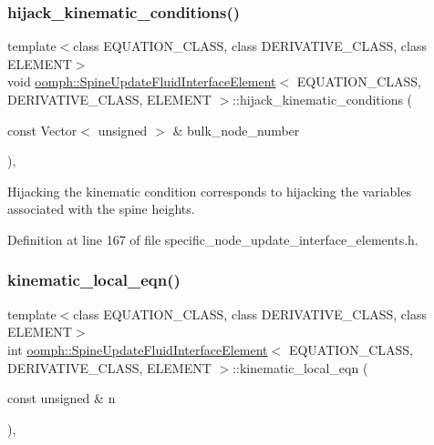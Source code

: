 \subsubsection{\texorpdfstring{hijack\+\_\+kinematic\+\_\+conditions()}{hijack\_kinematic\_conditions()}}
{\footnotesize\ttfamily template$<$class E\+Q\+U\+A\+T\+I\+O\+N\+\_\+\+C\+L\+A\+SS, class D\+E\+R\+I\+V\+A\+T\+I\+V\+E\+\_\+\+C\+L\+A\+SS, class E\+L\+E\+M\+E\+NT$>$ \\
void \hyperlink{classoomph_1_1SpineUpdateFluidInterfaceElement}{oomph\+::\+Spine\+Update\+Fluid\+Interface\+Element}$<$ E\+Q\+U\+A\+T\+I\+O\+N\+\_\+\+C\+L\+A\+SS, D\+E\+R\+I\+V\+A\+T\+I\+V\+E\+\_\+\+C\+L\+A\+SS, E\+L\+E\+M\+E\+NT $>$\+::hijack\+\_\+kinematic\+\_\+conditions (\begin{DoxyParamCaption}\item[{const Vector$<$ unsigned $>$ \&}]{bulk\+\_\+node\+\_\+number }\end{DoxyParamCaption})\hspace{0.3cm}{\ttfamily [inline]}, {\ttfamily [private]}}



Hijacking the kinematic condition corresponds to hijacking the variables associated with the spine heights. 



Definition at line 167 of file specific\+\_\+node\+\_\+update\+\_\+interface\+\_\+elements.\+h.

\mbox{\label{classoomph_1_1SpineUpdateFluidInterfaceElement_a94f737e046cb2796cb2b2dd5534bd3cd}} 
\subsubsection{\texorpdfstring{kinematic\+\_\+local\+\_\+eqn()}{kinematic\_local\_eqn()}}
{\footnotesize\ttfamily template$<$class E\+Q\+U\+A\+T\+I\+O\+N\+\_\+\+C\+L\+A\+SS, class D\+E\+R\+I\+V\+A\+T\+I\+V\+E\+\_\+\+C\+L\+A\+SS, class E\+L\+E\+M\+E\+NT$>$ \\
int \hyperlink{classoomph_1_1SpineUpdateFluidInterfaceElement}{oomph\+::\+Spine\+Update\+Fluid\+Interface\+Element}$<$ E\+Q\+U\+A\+T\+I\+O\+N\+\_\+\+C\+L\+A\+SS, D\+E\+R\+I\+V\+A\+T\+I\+V\+E\+\_\+\+C\+L\+A\+SS, E\+L\+E\+M\+E\+NT $>$\+::kinematic\+\_\+local\+\_\+eqn (\begin{DoxyParamCaption}\item[{const unsigned \&}]{n }\end{DoxyParamCaption})\hspace{0.3cm}{\ttfamily [inline]}, {\ttfamily [private]}}



